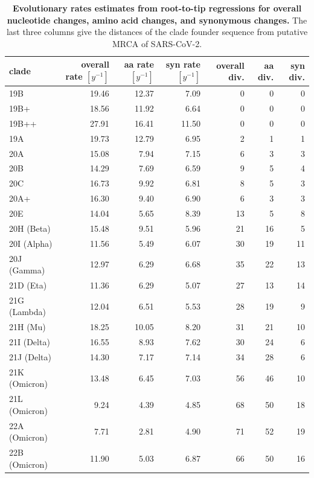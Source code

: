 \documentclass[aps,rmp, twocolumn]{revtex4}
\begin{document}
\begin{table}
\begin{tabular}{l|rrrrrr}
    \hline
    {\bf clade} &  overall rate $[y^{-1}]$ & aa rate $[y^{-1}]$ &  syn rate $[y^{-1}]$ & overall div. &  aa div. &  syn div. \\
    \hline
    19B &     19.46 &    12.37 &      7.09 &        0 &       0 &        0 \\
   19B+ &     18.56 &    11.92 &      6.64 &        0 &       0 &        0 \\
  19B++ &     27.91 &    16.41 &     11.50 &        0 &       0 &        0 \\
  19A &     19.73 &    12.79 &      6.95 &        2 &       1 &        1 \\
  20A &     15.08 &     7.94 &      7.15 &        6 &       3 &        3 \\
    20B &     14.29 &     7.69 &      6.59 &        9 &       5 &        4 \\
    20C &     16.73 &     9.92 &      6.81 &        8 &       5 &        3 \\
   20A+ &     16.30 &     9.40 &      6.90 &        6 &       3 &        3 \\
    20E &     14.04 &     5.65 &      8.39 &       13 &       5 &        8 \\
    20H (Beta) &     15.48 &     9.51 &      5.96 &       21 &      16 &        5 \\
    20I (Alpha) &     11.56 &     5.49 &      6.07 &       30 &      19 &       11 \\
    20J (Gamma) &     12.97 &     6.29 &      6.68 &       35 &      22 &       13 \\
    21D (Eta) &     11.36 &     6.29 &      5.07 &       27 &      13 &       14 \\
    21G (Lambda) &     12.04 &     6.51 &      5.53 &       28 &      19 &        9 \\
    21H (Mu) &     18.25 &    10.05 &      8.20 &       31 &      21 &       10 \\
    21I (Delta) &     16.55 &     8.93 &      7.62 &       30 &      24 &        6 \\
    21J (Delta) &     14.30 &     7.17 &      7.14 &       34 &      28 &        6 \\
    21K (Omicron) &     13.48 &     6.45 &      7.03 &       56 &      46 &       10 \\
    21L (Omicron) &      9.24 &     4.39 &      4.85 &       68 &      50 &       18 \\
    22A (Omicron) &      7.71 &     2.81 &      4.90 &       71 &      52 &       19 \\
    22B (Omicron) &     11.90 &     5.03 &      6.87 &       66 &      50 &       16 \\
           \hline
    \end{tabular}
\caption{{\bf Evolutionary rates estimates from root-to-tip regressions for overall nucleotide changes, amino acid changes, and synonymous changes.}
    The last three columns give the distances of the clade founder sequence from putative MRCA of SARS-CoV-2.
\label{tab:rates}}
\end{table}
\end{document}
